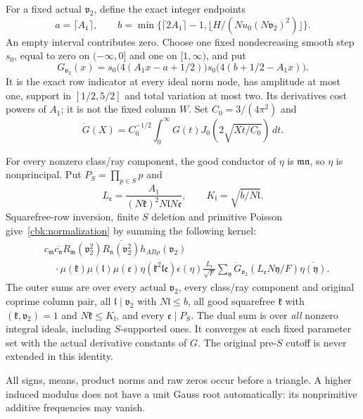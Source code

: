 For a fixed actual $\mathfrak v_2$, define the exact integer endpoints
\[
 a=\lceil A_1\rceil,\qquad
 b=\min\{\lceil2A_1\rceil-1,
                 \lfloor H/(Nu_0(N\mathfrak v_2)^2)\rfloor\}.
\]
An empty interval contributes zero. Choose one fixed nondecreasing
smooth step $s_0$, equal to zero on $(-\infty,0]$ and one on
$[1,\infty)$, and put
\begin{equation}\label{cbk:nodal}
 G_{\mathfrak v_2}(x)
  =s_0\bigl(4(A_1x-a+1/2)\bigr)
       s_0\bigl(4(b+1/2-A_1x)\bigr).
\end{equation}
It is the exact row indicator at every ideal norm node, has amplitude
at most one, support in $[1/2,5/2]$ and total variation at most two.
Its derivatives cost powers of $A_1$; it is not the fixed column $W$.
Set $C_0=3/(4\pi^2)$ and
\begin{equation}\label{cbk:bessel}
 \dot G(X)=C_0^{-1/2}\int_0^\infty
                   G(t)J_0(2\sqrt{Xt/C_0})\,dt.
\end{equation}

\begin{proposition}
\label{cbk:kernel}
For every nonzero class/ray component, the good conductor of $\eta$
is $\mathfrak m\mathfrak n$, so $\eta$ is nonprincipal. Put
$P_S=\prod_{p\in S}p$ and
\[
 L_{\mathfrak e}=\frac{A_1}
     {(N\mathfrak k)^2N\mathfrak l N\mathfrak e},\qquad
 K_{\mathfrak l}=\sqrt{b/N\mathfrak l}.
\]
Squarefree-row inversion, finite $S$ deletion and primitive Poisson
give~\eqref{cbk:normalization} by summing the following kernel:
\begin{equation}\label{cbk:exact-kernel}
 \begin{aligned}
 &c_{\mathfrak m}\overline{c_{\mathfrak n}}
 R_{\mathfrak m}(\mathfrak v_2^2)
       \overline{R_{\mathfrak n}(\mathfrak v_2^2)}
          h_{AB\rho}(\mathfrak v_2)\\
 &\quad\cdot\mu(\mathfrak k)\mu(\mathfrak l)\mu(\mathfrak e)
       \eta(\mathfrak k^2\mathfrak l\mathfrak e)
       \epsilon(\eta)\frac{L_{\mathfrak e}}{\sqrt F}
       \sum_{\mathfrak y}\dot G_{\mathfrak v_2}
               (L_{\mathfrak e}N\mathfrak y/F)
                                    \overline{\eta(\mathfrak y)}.
 \end{aligned}
\end{equation}
The outer sums are over every actual $\mathfrak v_2$, every class/ray
component and original coprime column pair, all
$\mathfrak l\mid\mathfrak v_2$ with $N\mathfrak l\le b$,
all good squarefree $\mathfrak k$ with $(\mathfrak k,\mathfrak v_2)=1$
and $N\mathfrak k\le K_{\mathfrak l}$, and every $\mathfrak e\mid P_S$.
The dual sum is over \emph{all} nonzero integral ideals, including
$S$-supported ones. It converges at each fixed parameter set with the
actual derivative constants of $G$. The original pre-$S$ cutoff is
never extended in this identity.
\end{proposition}
All signs, means, product norms and raw zeros occur before a triangle.
A higher induced modulus does not have a unit Gauss root automatically:
its nonprimitive additive frequencies may vanish.

